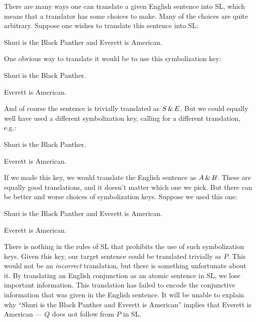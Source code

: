 There are many ways one can translate a given English sentence into SL, which means that a translator has some choices to make. Many of the choices are quite arbitrary. Suppose one wishes to translate this sentence into SL:

\begin{earg}
\item[] Shuri is the Black Panther and Everett is American.
\end{earg}

One obvious way to translate it would be to use this symbolization key:

\begin{ekey}
\item[S:] Shuri is the Black Panther.
\item[E:] Everett is American.
\end{ekey}

And of course the sentence is trivially translated as $S \,\&\, E$. But we could equally well have used a different symbolization key, calling for a different translation, e.g.:

\begin{ekey}
\item[A:] Shuri is the Black Panther.
\item[B:] Everett is American.
\end{ekey}

If we made this key, we would translate the English sentence as $A \,\&\, B$. These are equally good translations, and it doesn't matter which one we pick. But there can be better and worse choices of symbolization keys. Suppose we used this one:

\begin{ekey}
\item[P:] Shuri is the Black Panther and Everett is American.
\item[Q:] Everett is American.
\end{ekey}

There is nothing in the rules of SL that prohibits the use of such symbolization keys. Given this key, our target sentence could be translated trivially as $P$. This would not be an \emph{incorrect} translation, but there is something unfortunate about it. By translating an English conjunction as an atomic sentence in SL, we lose important information. This translation has failed to encode the conjunctive information that was given in the English sentence. It will be unable to explain why ``Shuri is the Black Panther and Everett is American'' implies that Everett is American --- $Q$ does not follow from $P$ in SL.

